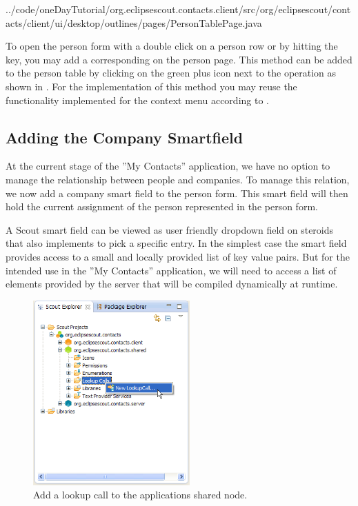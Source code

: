 \documentclass[a4paper,10pt,twoside]{book}
\begin{document}

{../code/oneDayTutorial/org.eclipsescout.contacts.client/src/org/eclipsescout/contacts/client/ui/desktop/outlines/pages/PersonTablePage.java}

To open the person form with a double click on a person row or by hitting the  key, you may add a corresponding  on the person page. 
This method can be added to the person table by clicking on the green plus icon next to the operation  as shown in . 
For the implementation of this method you may reuse the functionality implemented for the context menu according to . 

\subsection{Adding the Company Smartfield}

At the current stage of the ''My Contacts'' application, we have no option to manage the relationship between people and companies. 
To manage this relation, we now add a company smart field to the person form. 
This smart field will then hold the current assignment of the person represented in the person form. 

A Scout smart field can be viewed as user friendly dropdown field on steroids that also implements  to pick a specific entry. 
In the simplest case the smart field provides access to a small and locally provided list of key value pairs. 
But for the intended use in the ''My Contacts'' application, we will need to access a list of elements provided by the server that will be compiled dynamically at runtime. 

\begin{figure}
\includegraphics[width=6cm]{new_lookupcall_company_contextmenu.png} 
\caption{Add a lookup call to the applications shared node.}
\end{figure}
\end{document}
